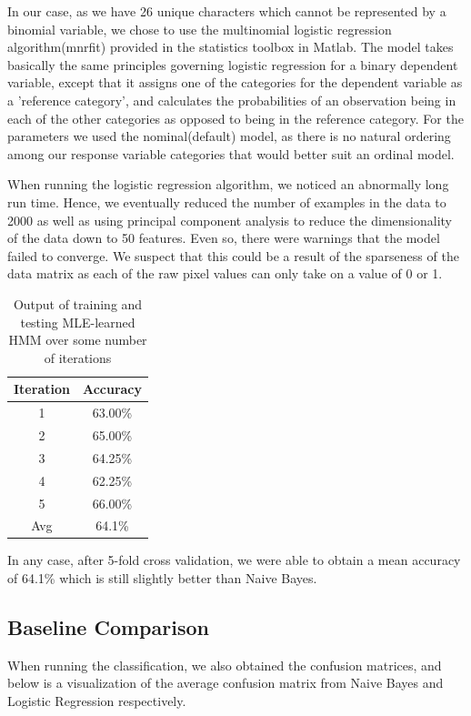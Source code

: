 \documentclass{article} %
\begin{document}
In our case, as we have 26 unique characters which cannot be represented by a binomial variable, we chose to use the multinomial logistic regression algorithm(mnrfit) provided in the statistics toolbox in Matlab. The model takes basically the same principles governing logistic regression for a binary dependent variable, except that it assigns one of the categories for the dependent variable as a 'reference category', and calculates the probabilities of an observation being in each of the other categories as opposed to being in the reference category. For the parameters we used the nominal(default) model, as there is no natural ordering among our response variable categories that would better suit an ordinal model.

When running the logistic regression algorithm, we noticed an abnormally long run time. Hence, we eventually reduced the number of examples in the data to 2000 as well as using principal component analysis to reduce the dimensionality of the data down to 50 features. Even so, there were warnings that the model failed to converge. We suspect that this could be a result of the sparseness of the data matrix as each of the raw pixel values can only take on a value of 0 or 1.

\begin{table}[h]
\centering
\begin{tabular}{|c|c|}
\hline
Iteration & Accuracy \\
\hline
1 & 63.00\% \\
2 & 65.00\% \\
3 & 64.25\% \\
4 & 62.25\% \\
5 & 66.00\% \\
\hline
Avg & 64.1\% \\ 
\hline
\end{tabular}
\caption{Output of training and testing MLE-learned HMM over some number of iterations}
\label{tab:mid-logr-results}
\end{table}

In any case, after 5-fold cross validation, we were able to obtain a mean accuracy of 64.1\% which is still slightly better than Naive Bayes.

\subsection{Baseline Comparison}
When running the classification, we also obtained the confusion matrices, and below is a visualization of the average confusion matrix from Naive Bayes and Logistic Regression respectively.
\end{document}
